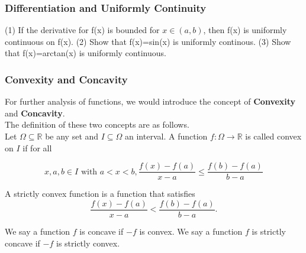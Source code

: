 \documentclass{beamer}
\begin{document}
\begin{frame}
    \frametitle{Differentiation and Uniformly Continuity}
    (1) If the derivative for f(x) is bounded for $x\in(a,b)$, then f(x) is uniformly continuous on f(x).
    (2) Show that f(x)=sin(x) is uniformly continous.
    (3) Show that f(x)=arctan(x) is uniformly continuous.
\end{frame}

\begin{frame}
    \frametitle{Convexity and Concavity}

    For further analysis of functions, we would introduce the concept of \textbf{Convexity} and \textbf{Concavity}. \\
    The definition of these two concepts are as follows.\\

    \hspace{1em}
    Let $\Omega\subseteq\mathbb{R}$ be any set and $I\subseteq\Omega$ an interval. A function $f:\Omega\rightarrow\mathbb{R}$
    is called convex on $I$ if for all

    \begin{equation*}
        x, a, b\in I \text{ with } a<x<b, \frac{f(x)-f(a)}{x-a}\leq\frac{f(b)-f(a)}{b-a}
    \end{equation*}

    \vspace{0.5em}
    \hspace{1em}
    A strictly convex function is a function that satisfies
    \begin{equation}
        \frac{f(x)-f(a)}{x-a}<\frac{f(b)-f(a)}{b-a}.
    \end{equation}

    \hspace{1em}
    We say a function $f$ is concave if $-f$ is convex. We say a function $f$ is strictly concave if $-f$ is strictly convex.
\end{frame}
\end{document}
